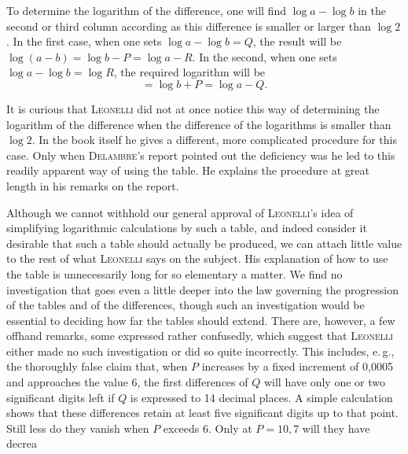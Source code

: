 To determine the logarithm of the difference, one will find $\log a - \log b$ in the second or third column according as this difference is smaller or larger than $\log 2$. In the first case, when one sets $\log a - \log b = Q$, the result will be $\log(a-b) = \log b - P = \log a - R$. In the second, when one sets $\log a - \log b = \log R$, the required logarithm will be
\[
= \log b + P = \log a - Q.
\]

It is curious that \textsc{Leonelli} did not at once notice this way of determining the logarithm of the difference when the difference of the logarithms is smaller than $\log 2$. In the book itself he gives a different, more complicated procedure for this case. Only when \textsc{Delambre}'s report pointed out the deficiency was he led to this readily apparent way of using the table. He explains the procedure at great length in his remarks on the report.

Although we cannot withhold our general approval of \textsc{Leonelli}'s idea of simplifying logarithmic calculations by such a table, and indeed consider it desirable that such a table should actually be produced, we can attach little value to the rest of what \textsc{Leonelli} says on the subject. His explanation of how to use the table is unnecessarily long for so elementary a matter. We find no investigation that goes even a little deeper into the law governing the progression of the tables and of the differences, though such an investigation would be essential to deciding how far the tables should extend. There are, however, a few offhand remarks, some expressed rather confusedly, which suggest that \textsc{Leonelli} either made no such investigation or did so quite incorrectly. This includes, e.\,g., the thoroughly false claim that, when $P$ increases by a fixed increment of 0,0005 and approaches the value 6, the first differences of $Q$ will have only one or two significant digits left if $Q$ is expressed to 14 decimal places. A simple calculation shows that these differences retain at least five significant digits up to that point. Still less do they vanish when $P$ exceeds 6. Only at $P = 10,7$ will they have decrea%

